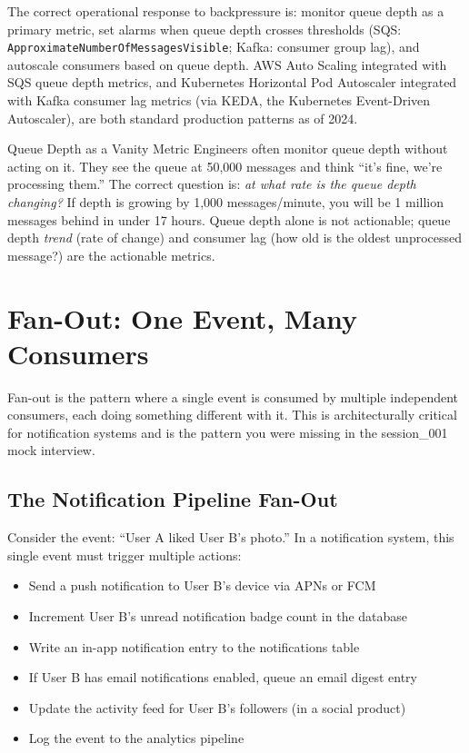 \documentclass[11pt,a4paper]{article}
\begin{document}
The correct operational response to backpressure is: monitor queue depth as a primary metric, set alarms when queue depth crosses thresholds (SQS: \texttt{ApproximateNumberOfMessagesVisible}; Kafka: consumer group lag), and autoscale consumers based on queue depth. AWS Auto Scaling integrated with SQS queue depth metrics, and Kubernetes Horizontal Pod Autoscaler integrated with Kafka consumer lag metrics (via KEDA, the Kubernetes Event-Driven Autoscaler), are both standard production patterns as of 2024.

\begin{trapbox}{Queue Depth as a Vanity Metric}
Engineers often monitor queue depth without acting on it. They see the queue at 50,000 messages and think ``it's fine, we're processing them.'' The correct question is: \textit{at what rate is the queue depth changing?} If depth is growing by 1,000 messages/minute, you will be 1 million messages behind in under 17 hours. Queue depth alone is not actionable; queue depth \textit{trend} (rate of change) and consumer lag (how old is the oldest unprocessed message?) are the actionable metrics.
\end{trapbox}

\section{Fan-Out: One Event, Many Consumers}

Fan-out is the pattern where a single event is consumed by multiple independent consumers, each doing something different with it. This is architecturally critical for notification systems and is the pattern you were missing in the session\_001 mock interview.

\subsection{The Notification Pipeline Fan-Out}

Consider the event: ``User A liked User B's photo.'' In a notification system, this single event must trigger multiple actions:

\begin{itemize}[leftmargin=1.5em, itemsep=3pt]
  \item Send a push notification to User B's device via APNs or FCM
  \item Increment User B's unread notification badge count in the database
  \item Write an in-app notification entry to the notifications table
  \item If User B has email notifications enabled, queue an email digest entry
  \item Update the activity feed for User B's followers (in a social product)
  \item Log the event to the analytics pipeline
\end{itemize}
\end{document}
